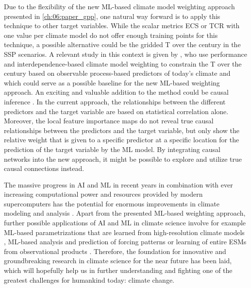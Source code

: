 Due to the flexibility of the new \ac{ML}-based climate model weighting
approach presented in \cref{ch:06:paper_gpp}, one natural way forward is to
apply this technique to other target variables. While the scalar metrics
\ac{ECS} or \ac{TCR} with one value per climate model do not offer enough
training points for this technique, a possible alternative could be the gridded
\acl{T} over the  century in the \ac{SSP} scenarios. A relevant study
in this context is given by \textcite{Brunner2020}, who use performance and
interdependence-based climate model weighting to constrain the \acl{T} over the
 century based on observable process-based predictors of today's
climate and which could serve as a possible baseline for the new \ac{ML}-based
weighting approach. An exciting and valuable addition to the method could be
causal inference \autocite{Nowack2020, Runge2019}. In the current approach, the
relationships between the different predictors and the target variable are
based on statistical correlation alone. Moreover, the local feature importance
maps do not reveal true causal relationships between the predictors and the
target variable, but only show the relative weight that is given to a specific
predictor at a specific location for the prediction of the target variable by
the \ac{ML} model. By integrating causal networks into the new approach, it
might be possible to explore and utilize true causal connections instead.

The massive progress in \ac{AI} and \ac{ML} in recent years in combination with
ever increasing computational power and resources provided by modern
supercomputers has the potential for enormous improvements in climate modeling
and analysis \autocite{Reichstein2019}. Apart from the presented \ac{ML}-based
weighting approach, further possible applications of \ac{AI} and \ac{ML} in
climate science involve for example \ac{ML}-based parametrizations that are
learned from high-resolution climate models \autocite{Rasp2018}, \ac{ML}-based
analysis and prediction of forcing patterns \autocite{Barnes2019,
  Mansfield2020} or learning of entire \acp{ESM} from observational products
\autocite{Geer2021}. Therefore, the foundation for innovative and
groundbreaking research in climate science for the near future has been laid,
which will hopefully help us in further understanding and fighting one of the
greatest challenges for humankind today: climate change.
